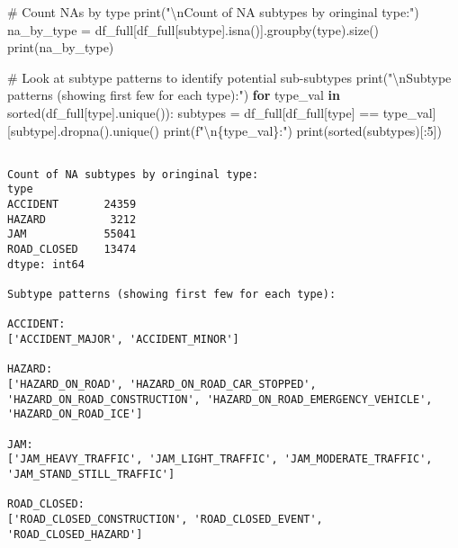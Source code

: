 \documentclass[
  letterpaper,
  DIV=11,
  numbers=noendperiod]{scrartcl}
\newenvironment{Shaded}{\begin{snugshade}}{\end{snugshade}}
\newcommand{\BuiltInTok}[1]{\textcolor[rgb]{0.00,0.23,0.31}{#1}}
\newcommand{\CharTok}[1]{\textcolor[rgb]{0.13,0.47,0.30}{#1}}
\newcommand{\CommentTok}[1]{\textcolor[rgb]{0.37,0.37,0.37}{#1}}
\newcommand{\ControlFlowTok}[1]{\textcolor[rgb]{0.00,0.23,0.31}{\textbf{#1}}}
\newcommand{\DecValTok}[1]{\textcolor[rgb]{0.68,0.00,0.00}{#1}}
\newcommand{\KeywordTok}[1]{\textcolor[rgb]{0.00,0.23,0.31}{\textbf{#1}}}
\newcommand{\NormalTok}[1]{\textcolor[rgb]{0.00,0.23,0.31}{#1}}
\newcommand{\OperatorTok}[1]{\textcolor[rgb]{0.37,0.37,0.37}{#1}}
\newcommand{\SpecialCharTok}[1]{\textcolor[rgb]{0.37,0.37,0.37}{#1}}
\newcommand{\SpecialStringTok}[1]{\textcolor[rgb]{0.13,0.47,0.30}{#1}}
\newcommand{\StringTok}[1]{\textcolor[rgb]{0.13,0.47,0.30}{#1}}
\begin{document}
\begin{Shaded}
\begin{Highlighting}[]
\CommentTok{\# Count NAs by type}
\BuiltInTok{print}\NormalTok{(}\StringTok{"}\CharTok{\textbackslash{}n}\StringTok{Count of NA subtypes by oringinal type:"}\NormalTok{)}
\NormalTok{na\_by\_type }\OperatorTok{=}\NormalTok{ df\_full[df\_full[}\StringTok{\textquotesingle{}subtype\textquotesingle{}}\NormalTok{].isna()].groupby(}\StringTok{\textquotesingle{}type\textquotesingle{}}\NormalTok{).size()}
\BuiltInTok{print}\NormalTok{(na\_by\_type)}

\CommentTok{\# Look at subtype patterns to identify potential sub{-}subtypes}
\BuiltInTok{print}\NormalTok{(}\StringTok{"}\CharTok{\textbackslash{}n}\StringTok{Subtype patterns (showing first few for each type):"}\NormalTok{)}
\ControlFlowTok{for}\NormalTok{ type\_val }\KeywordTok{in} \BuiltInTok{sorted}\NormalTok{(df\_full[}\StringTok{\textquotesingle{}type\textquotesingle{}}\NormalTok{].unique()):}
\NormalTok{    subtypes }\OperatorTok{=}\NormalTok{ df\_full[df\_full[}\StringTok{\textquotesingle{}type\textquotesingle{}}\NormalTok{] }\OperatorTok{==}\NormalTok{ type\_val][}\StringTok{\textquotesingle{}subtype\textquotesingle{}}\NormalTok{].dropna().unique()}
    \BuiltInTok{print}\NormalTok{(}\SpecialStringTok{f"}\CharTok{\textbackslash{}n}\SpecialCharTok{\{}\NormalTok{type\_val}\SpecialCharTok{\}}\SpecialStringTok{:"}\NormalTok{)}
    \BuiltInTok{print}\NormalTok{(}\BuiltInTok{sorted}\NormalTok{(subtypes)[:}\DecValTok{5}\NormalTok{])  }
\end{Highlighting}
\end{Shaded}

\begin{verbatim}

Count of NA subtypes by oringinal type:
type
ACCIDENT       24359
HAZARD          3212
JAM            55041
ROAD_CLOSED    13474
dtype: int64

Subtype patterns (showing first few for each type):

ACCIDENT:
['ACCIDENT_MAJOR', 'ACCIDENT_MINOR']

HAZARD:
['HAZARD_ON_ROAD', 'HAZARD_ON_ROAD_CAR_STOPPED', 'HAZARD_ON_ROAD_CONSTRUCTION', 'HAZARD_ON_ROAD_EMERGENCY_VEHICLE', 'HAZARD_ON_ROAD_ICE']

JAM:
['JAM_HEAVY_TRAFFIC', 'JAM_LIGHT_TRAFFIC', 'JAM_MODERATE_TRAFFIC', 'JAM_STAND_STILL_TRAFFIC']

ROAD_CLOSED:
['ROAD_CLOSED_CONSTRUCTION', 'ROAD_CLOSED_EVENT', 'ROAD_CLOSED_HAZARD']
\end{verbatim}
\end{document}
